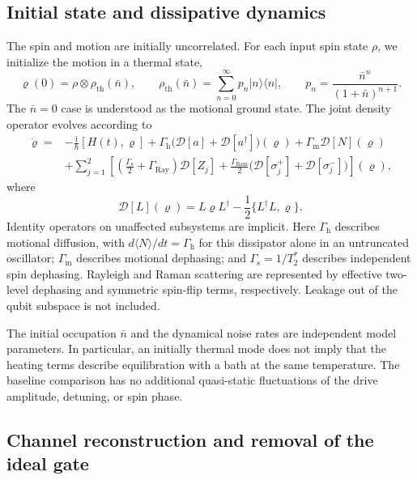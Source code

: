 \documentclass[a4paper,11pt]{article}
\newcommand{\ii}{\mathrm{i}}
\newcommand{\ket}[1]{\lvert #1\rangle}
\newcommand{\bra}[1]{\langle #1\rvert}
\newcommand{\Diss}{\mathcal D}
\begin{document}
\subsection{Initial state and dissipative dynamics}
\label{subsec:master_equation}

The spin and motion are initially uncorrelated. For each input spin state
$\rho$, we initialize the motion in a thermal state,
\begin{equation}
 \varrho(0)=\rho\otimes\rho_{\mathrm{th}}(\bar n),\qquad
 \rho_{\mathrm{th}}(\bar n)=\sum_{n=0}^{\infty}p_n\ket n\bra n,
 \qquad p_n=\frac{\bar n^n}{(1+\bar n)^{n+1}}.
 \label{eq:methods_thermal}
\end{equation}
The $\bar n=0$ case is understood as the motional ground state.
The joint density operator evolves according to
\begin{align}
 \dot\varrho={}&-\frac{\ii}{\hbar}[H(t),\varrho]
 +\Gamma_{\mathrm h}\bigl(\Diss[a]+\Diss[a^\dagger]\bigr)(\varrho)
 +\Gamma_{\mathrm m}\Diss[N](\varrho) \nonumber\\
 &+\sum_{j=1}^2\left[
 \left(\frac{\Gamma_{\mathrm s}}{2}+\Gamma_{\mathrm{Ray}}\right)
       \Diss[Z_j]
 +\frac{\Gamma_{\mathrm{Ram}}}{2}
       \bigl(\Diss[\sigma_j^+]+\Diss[\sigma_j^-]\bigr)
 \right](\varrho),
 \label{eq:methods_master}
\end{align}
where
\begin{equation}
 \Diss[L](\varrho)=L\varrho L^\dagger
   -\frac12\{L^\dagger L,\varrho\}.
\end{equation}
Identity operators on unaffected subsystems are implicit.
Here $\Gamma_{\mathrm h}$ describes motional diffusion, with
$d\langle N\rangle/dt=\Gamma_{\mathrm h}$ for this dissipator alone in
an untruncated oscillator; $\Gamma_{\mathrm m}$ describes motional
dephasing; and $\Gamma_{\mathrm s}=1/T_2^*$ describes independent spin
dephasing. Rayleigh and Raman scattering are represented by effective
two-level dephasing and symmetric spin-flip terms, respectively. Leakage
out of the qubit subspace is not included.

The initial occupation $\bar n$ and the dynamical noise rates are
independent model parameters. In particular, an initially thermal mode
does not imply that the heating terms describe equilibration with a bath
at the same temperature. The baseline comparison has no additional
quasi-static fluctuations of the drive amplitude, detuning, or spin phase.

\subsection{Channel reconstruction and removal of the ideal gate}
\label{subsec:channel_reconstruction}
\end{document}
